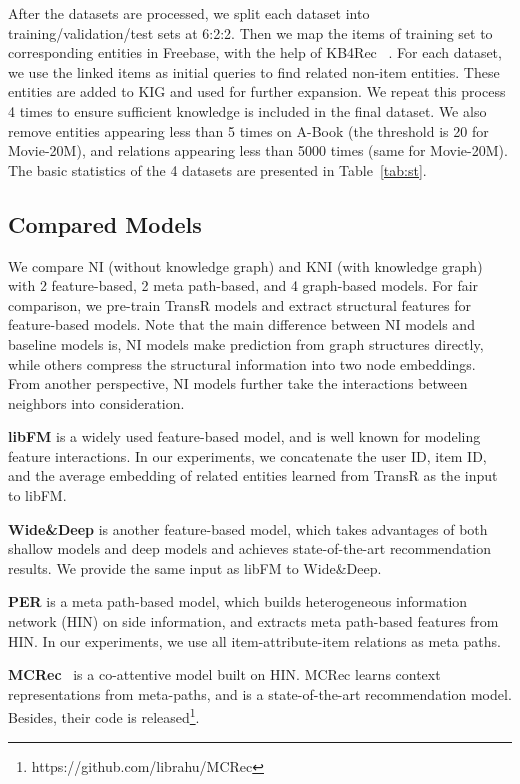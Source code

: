 \documentclass[sigconf]{acmart}
\newcommand{\new}[1]{{\color{black} #1}}
\begin{document}
After the datasets are processed, we split each dataset into training/validation/test sets at 6:2:2.
Then we map the items of training set to corresponding entities in Freebase, with the help of KB4Rec ~\cite{zhao2018kb4rec}.
For each dataset, we use the linked items as initial queries to find related non-item entities.
These entities are added to KIG and used for further expansion.
We repeat this process 4 times to ensure sufficient knowledge is included in the final dataset.
We also remove entities appearing less than 5 times on A-Book (the threshold is 20 for Movie-20M), and relations appearing less than 5000 times (same for Movie-20M).
The basic statistics of the 4 datasets are presented in Table~\ref{tab:st}.

\subsection{Compared Models}

We compare NI (without knowledge graph) and KNI (with knowledge graph) with 2 feature-based, 2 meta path-based, and 4 graph-based models. For fair comparison, we pre-train TransR models and extract structural features for feature-based models. \new{Note that the main difference between NI models and baseline models is, NI models make prediction from graph structures directly, while others compress the structural information into two node embeddings. From another perspective, NI models further take the interactions between neighbors into consideration.}

\textbf{libFM} \cite{rendle2010factorization} is a widely used feature-based model, and is well known for modeling feature interactions. In our experiments, we concatenate the user ID, item ID, and the average embedding of related entities learned from TransR \cite{lin2015learning} as the input to libFM.

\textbf{Wide\&Deep} \cite{cheng2016wide} is another feature-based model, which takes  advantages of both shallow models and deep models and achieves state-of-the-art recommendation results. We provide the same input as libFM to Wide\&Deep.

\textbf{PER} \cite{yu2014personalized} is a meta path-based model, which builds heterogeneous information network (HIN) on side information, and extracts meta path-based features from HIN. 
In our experiments, we use all item-attribute-item relations as meta paths. 

\textbf{MCRec}~\cite{hu2018leveraging} is a co-attentive model built on HIN. MCRec learns context representations from meta-paths, and is a state-of-the-art recommendation model. Besides, their code is released\footnote{https://github.com/librahu/MCRec}.
\end{document}

